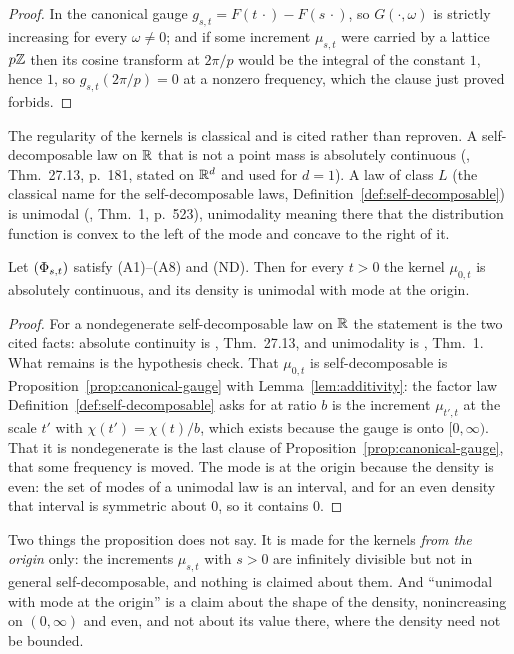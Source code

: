 \begin{proof}
In the canonical gauge $g_{s,t} = F(t\,\cdot) - F(s\,\cdot)$, so $G(\cdot,\omega)$ is strictly
increasing for every $\omega \ne 0$; and if some increment $\mu_{s,t}$ were carried by a lattice
$p\mathbb{Z}$ then its cosine transform at $2\pi/p$ would be the integral of the constant $1$, hence
$1$, so $g_{s,t}(2\pi/p) = 0$ at a nonzero frequency, which the clause just proved forbids.
\end{proof}

The regularity of the kernels is classical and is cited rather than reproven. A
self-decomposable law on $\mathbb{R}$ that is not a point mass is absolutely continuous
(, Thm.~27.13, p.~181, stated on $\mathbb{R}^d$ and used for $d = 1$). A law
of class $L$ (the classical name for the self-decomposable laws,
Definition~\ref{def:self-decomposable}) is unimodal (,
Thm.~1, p.~523), unimodality
meaning there that the distribution function is convex to the left of the mode and concave to
the right of it.

\begin{proposition}\label{prop:kernel-regularity}
Let $(\Phi_{s,t})$ satisfy (A1)--(A8) and (ND). Then for every $t > 0$ the kernel $\mu_{0,t}$
is absolutely continuous, and its density is unimodal with mode at the origin.
\end{proposition}

\begin{proof}
For a nondegenerate self-decomposable law on $\mathbb{R}$ the statement is the two cited facts:
absolute continuity is , Thm.~27.13, and unimodality is
, Thm.~1. What remains is the hypothesis check. That
$\mu_{0,t}$ is self-decomposable is Proposition~\ref{prop:canonical-gauge} with
Lemma~\ref{lem:additivity}: the factor law Definition~\ref{def:self-decomposable} asks for at
ratio $b$ is the increment $\mu_{t',t}$ at the scale $t'$ with $\chi(t') = \chi(t)/b$, which
exists because the gauge is onto $[0,\infty)$. That it is nondegenerate is the last clause
of Proposition~\ref{prop:canonical-gauge}, that some frequency is moved. The mode is at the
origin because the density is even: the set of modes of a unimodal law is an interval, and
for an even density that interval is symmetric about $0$, so it contains $0$.
\end{proof}

Two things the proposition does not say. It is made for the kernels \emph{from the origin} only: the
increments $\mu_{s,t}$ with $s > 0$ are infinitely divisible but not in general
self-decomposable, and nothing is claimed about them. And ``unimodal with mode at the
origin'' is a claim about the shape of the density, nonincreasing on $(0,\infty)$ and even,
and not about its value there, where the density need not be bounded.

